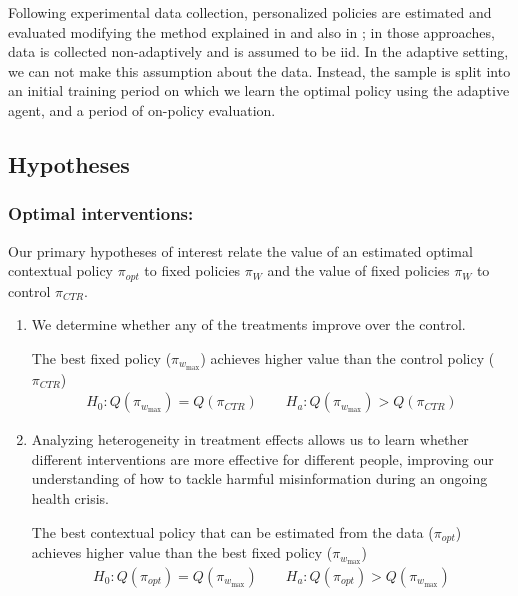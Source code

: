 \documentclass[letterpaper, 12pt, parskip=full,DIV=12]{scrartcl}
\begin{document}
Following experimental data collection, personalized policies are estimated and evaluated modifying the method explained in \cite{athey2017efficient} and also in \cite{zhou2018offline}; in those approaches, data is collected non-adaptively and is assumed to be iid. In the adaptive setting, we can not make this assumption about the data. Instead, the sample is split into an initial training period on which we learn the optimal policy using the adaptive agent, and a period of on-policy evaluation. 


\subsection{Hypotheses}

\subsubsection{Optimal interventions:}

Our primary hypotheses of interest relate the value of an estimated optimal contextual policy $\pi_{opt}$ to fixed policies $\pi_{W}$ and the value of fixed policies $\pi_{W}$ to control $\pi_{CTR}$.

\begin{enumerate}
\item[ ] 
We determine whether any of the treatments improve over the control. 
\begin{hypothesis} The best fixed policy ($\pi_{w_{\textrm{max} } }$) achieves higher value than the control policy ($\pi_{CTR}$)   \label{eq:control_null}
\begin{align*}
H_{0}: Q(\pi_{w_{\textrm{max} } }) = Q(\pi_{CTR}) \qquad H_{a}:  Q(\pi_{w_{\textrm{max} } }) > Q(\pi_{CTR})
\end{align*}
\end{hypothesis}
  \item[ ]
  
  Analyzing heterogeneity in treatment effects allows us to learn whether different interventions are more effective for different people, improving our understanding of how to tackle harmful misinformation during an ongoing health crisis.
  \begin{hypothesis}
  The best contextual policy that can be estimated from the data ($\pi_{opt}$) achieves higher value than the best fixed policy ($\pi_{w_{\textrm{max} } }$)\label{eq:bestfix_null}
\begin{align*}
  H_{0}: Q(\pi_{opt}) = Q(\pi_{w_{\textrm{max}}}) \qquad H_{a}:  Q(\pi_{opt}) > Q(\pi_{w_{\textrm{max}}})
\end{align*}
\end{hypothesis}
\end{enumerate}
\end{document}
